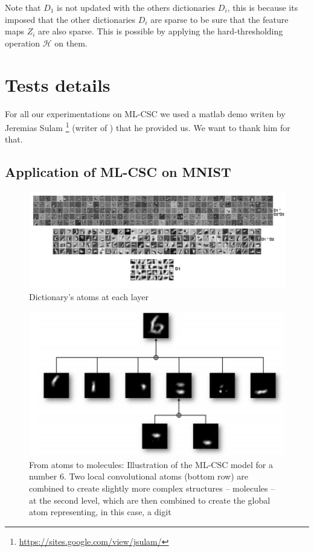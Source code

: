 Note that $D_1$ is not updated with the others dictionaries $D_i$, this is because its imposed that the other dictionaries $D_i$ are sparse to be sure that the feature maps $Z_i$ are also sparse. This is possible by applying the hard-thresholding operation $\mathcal{H}$ on them.
\section{Tests details}
For all our experimentations on ML-CSC we used a matlab demo writen by 
Jeremias Sulam \footnote{\url{https://sites.google.com/view/jsulam/}} (writer of \cite{DBLP:journals/corr/abs-1708-08705,8398588}) that he provided us. We want to thank him for that.
\subsection{Application of ML-CSC on MNIST}
\begin{figure}[h]
 \centering
 \includegraphics[scale=2]{Discriminative_CSC.png}
 \caption{Dictionary's atoms at each layer}
 \label{fig:DCSC}
\end{figure}
\begin{figure}[h]
 \centering
 \includegraphics[scale=0.3]{decomp.png}
 \caption{From atoms to molecules: Illustration of the ML-CSC
model for a number 6. Two local convolutional atoms (bottom
row) are combined to create slightly more complex structures
– molecules – at the second level, which are then combined
to create the global atom representing, in this case, a digit \cite{DBLP:journals/corr/abs-1708-08705}}
 \label{fig:decomp}
\end{figure}

